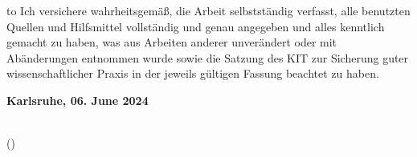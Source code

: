
\thispagestyle{empty}
\null\vfill
\noindent\hbox to \textwidth{\hrulefill} 
%
% 
%
{Ich versichere wahrheitsgemäß, die Arbeit selbstständig verfasst, alle benutzten 
Quellen und Hilfsmittel vollständig und genau angegeben und alles kenntlich gemacht 
zu haben, was aus Arbeiten anderer unverändert oder mit Abänderungen entnommen wurde 
sowie die Satzung des KIT zur Sicherung guter wissenschaftlicher Praxis in der 
jeweils gültigen Fassung beachtet zu haben. }
 
 
\textbf{Karlsruhe, 06. June 2024}
\vspace{1.5cm}
 
\dotfill\hspace*{8.0cm}\\
\hspace*{2cm}(\theauthor) 
\cleardoublepage